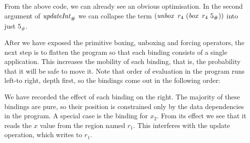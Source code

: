 From the above code, we can already see an obvious optimisation. In the second argument of $\operatorname{\mathit{updateInt}}_{\#}$ we can collapse the term $(\iunbox \ r_4 \ (\ibox \ r_4 \ 5_{\#}))$ into just $5_{\#}$.

After we have exposed the primitive boxing, unboxing and forcing operators, the next step is to flatten the program so that each binding consists of a single application. This increases the mobility of each binding, that is, the probability that it will be safe to move it. Note that order of evaluation in the program runs left-to right, depth first, so the bindings come out in the following order:

\bigskip
{}

We have recorded the effect of each binding on the right. The majority of these bindings are pure, so their position is constrained only by the data dependencies in the program. A special case is the binding for $x_2$. From its effect we see that it reads the $x$ value from the region named $r_1$. This interferes with the update operation, which writes to $r_1$. 

